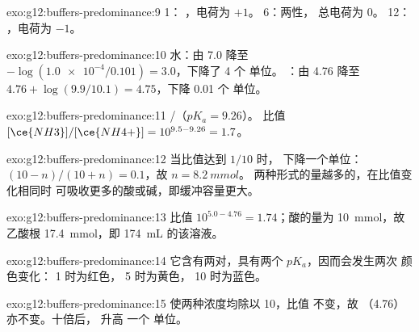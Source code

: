 \begin{solution}{exo:g12:buffers-predominance:9}
 1： ，电荷为 $+1$。 6：两性，
总电荷为 0。 12： ，电荷为 $-1$。
\end{solution}

\begin{solution}{exo:g12:buffers-predominance:10}
水：由 7.0 降至 $-\log(\num{1.0e-4}/0.101) = 3.0$，下降了 4 个  单位。
：由 4.76 降至 $4.76 + \log(9.9/10.1) = 4.75$，下降 0.01 个  单位。
\end{solution}

\begin{solution}{exo:g12:buffers-predominance:11}
/（$pK_a = 9.26$）。
比值 $[\ce{NH3}]/[\ce{NH4+}] = 10^{9.5 - 9.26} = 1.7$。
\end{solution}

\begin{solution}{exo:g12:buffers-predominance:12}
当比值达到 $1/10$ 时， 下降一个单位：
$(10 - n)/(10 + n) = 0.1$，故 $n = \qty{8.2}{mmol}$。
两种形式的量越多的，在比值变化相同时
可吸收更多的酸或碱，即缓冲容量更大。
\end{solution}

\begin{solution}{exo:g12:buffers-predominance:13}
比值 $10^{5.0 - 4.76} = 1.74$；酸的量为 \qty{10}{mmol}，故
乙酸根 \qty{17.4}{mmol}，即 \qty{174}{mL} 的该溶液。
\end{solution}

\begin{solution}{exo:g12:buffers-predominance:14}
它含有两对，具有两个 $pK_a$，因而会发生两次
颜色变化： 1 时为红色， 5 时为黄色， 10 时为蓝色。
\end{solution}

\begin{solution}{exo:g12:buffers-predominance:15}
使两种浓度均除以 10，比值
不变，故 （4.76）亦不变。十倍后， 升高
一个  单位。
\end{solution}

